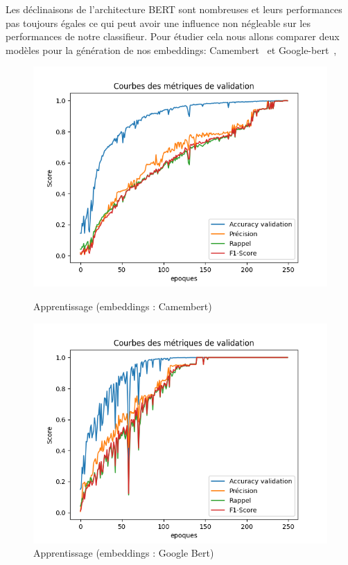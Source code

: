 \documentclass[12pt]{article}
\begin{document}
Les déclinaisons de l'architecture BERT sont nombreuses et leurs performances pas toujours égales ce qui peut avoir une influence non négleable sur 
les performances de notre classifieur. Pour étudier cela nous allons comparer deux modèles pour la génération de nos embeddings: 
Camembert~\cite{DBLP:journals/corr/abs-1911-03894} et Google-bert~\cite{devlin2019bertpretrainingdeepbidirectional},
\begin{figure}[H]
    \centering
    \begin{minipage}[b]{0.45\textwidth}
        \centering
        \includegraphics[width=\textwidth]{static/mdl_camembert.png} 
        \caption{Apprentissage (embeddings : Camembert)}
        \label{fig:camenbert}
    \end{minipage}
    \hfill
    \begin{minipage}[b]{0.45\textwidth}
        \centering
        \includegraphics[width=\textwidth]{static/mdl_google_bert.png} 
        \caption{Apprentissage (embeddings : Google Bert)}
        \label{fig:google_bert}
    \end{minipage}
\end{figure}
\end{document}
